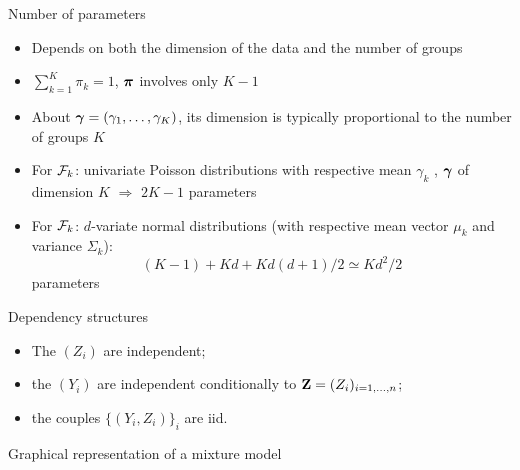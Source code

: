 \documentclass[compress,10pt]{beamer}
\begin{document}
\begin{frame}{Number of parameters}
\begin{itemize}
 \item Depends on both the dimension of the data and the number of groups
  \item $\sum_{k=1}^K \pi_k = 1$, $\boldsymbol{\pi}$ involves only $K-1$
  \item About $\boldsymbol{\gamma} = (\gamma_1, \dots, \gamma_K)$, its dimension is typically proportional to the number of groups $K$
  \item For \textcolor{dgreen}{$\mathcal{F}_k$: univariate Poisson distributions with respective mean $\gamma_k$ } , $\boldsymbol{\gamma}$ of dimension $K$ $\Rightarrow$ $2K-1$ parameters
 \item For \textcolor{dgreen}{$\mathcal{F}_k$: $d$-variate normal distributions} (with respective mean vector $\mu_k$ and variance $\Sigma_k$): $$(K-1) + Kd + Kd(d+1)/2 \simeq Kd^2/2$$ parameters 
\end{itemize}
\end{frame}


\begin{frame}{Dependency structures}
 \begin{itemize}
 \item The $(Z_i)$ are independent;
 \item the $(Y_i)$ are independent conditionally to $\mathbf{Z} = (Z_i)_{i=1,\dots,n}$;
\item the couples $\{(Y_i, Z_i)\}_i$ are iid.
 \end{itemize}
% 
 \begin{center}
 
 Graphical representation of a mixture model
 \end{center}
\end{frame}
\end{document}
